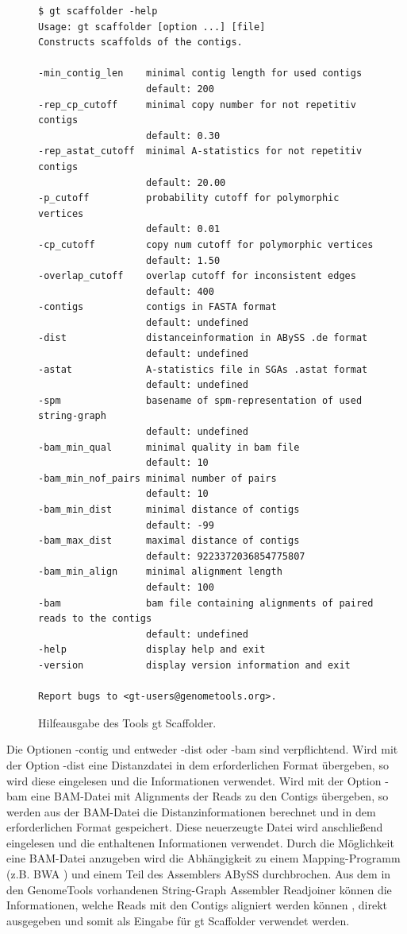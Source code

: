 \documentclass[a4paper,10pt,parskip]{scrartcl}
\begin{document}
\begin{figure}
\begin{verbatim}
$ gt scaffolder -help
Usage: gt scaffolder [option ...] [file]
Constructs scaffolds of the contigs.

-min_contig_len    minimal contig length for used contigs
                   default: 200
-rep_cp_cutoff     minimal copy number for not repetitiv contigs
                   default: 0.30
-rep_astat_cutoff  minimal A-statistics for not repetitiv contigs
                   default: 20.00
-p_cutoff          probability cutoff for polymorphic vertices
                   default: 0.01
-cp_cutoff         copy num cutoff for polymorphic vertices
                   default: 1.50
-overlap_cutoff    overlap cutoff for inconsistent edges
                   default: 400
-contigs           contigs in FASTA format
                   default: undefined
-dist              distanceinformation in ABySS .de format
                   default: undefined
-astat             A-statistics file in SGAs .astat format
                   default: undefined
-spm               basename of spm-representation of used string-graph
                   default: undefined
-bam_min_qual      minimal quality in bam file
                   default: 10
-bam_min_nof_pairs minimal number of pairs
                   default: 10
-bam_min_dist      minimal distance of contigs
                   default: -99
-bam_max_dist      maximal distance of contigs
                   default: 9223372036854775807
-bam_min_align     minimal alignment length
                   default: 100
-bam               bam file containing alignments of paired reads to the contigs
                   default: undefined
-help              display help and exit
-version           display version information and exit

Report bugs to <gt-users@genometools.org>.
\end{verbatim}
\caption{\label{abb: help}Hilfeausgabe des Tools gt Scaffolder.}
\end{figure}

Die Optionen -contig und entweder -dist oder -bam sind
verpflichtend. Wird mit der Option -dist eine Distanzdatei in dem
erforderlichen Format übergeben, so wird diese eingelesen und die
Informationen verwendet. Wird mit der Option -bam eine BAM-Datei mit
Alignments der Reads zu den Contigs übergeben, so werden aus der
BAM-Datei die Distanzinformationen berechnet und in dem erforderlichen
Format gespeichert. Diese neuerzeugte Datei wird anschließend
eingelesen und die enthaltenen Informationen verwendet. Durch die
Möglichkeit eine BAM-Datei anzugeben wird die Abhängigkeit zu einem
Mapping-Programm (z.B. BWA \cite{BWA}) und einem Teil des
Assemblers ABySS \cite{abyss} durchbrochen. Aus dem in den
GenomeTools vorhandenen String-Graph Assembler Readjoiner können die
Informationen, welche Reads mit den Contigs aligniert werden können ,
direkt ausgegeben und somit als Eingabe für gt Scaffolder verwendet
werden.
\end{document}

